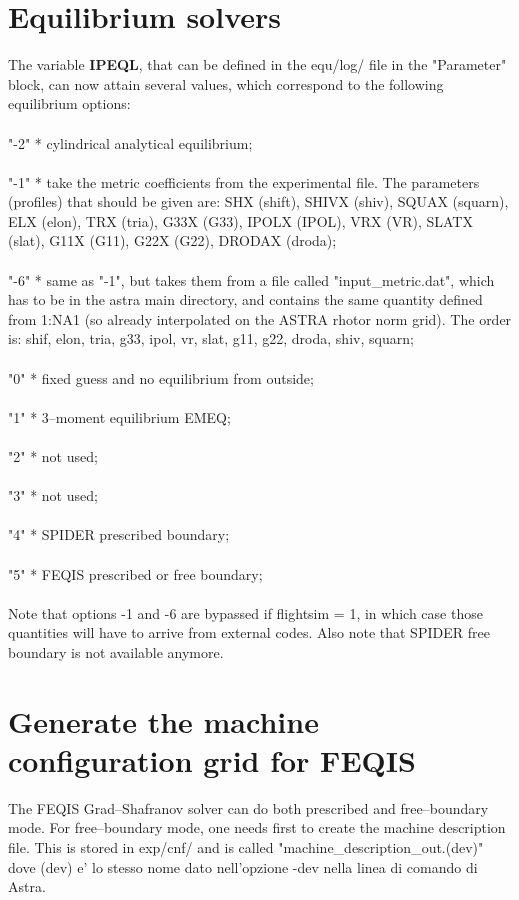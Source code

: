 \documentclass[12pt]{article}
\begin{document}

\section{Equilibrium solvers}
The variable {\bf IPEQL}, that can be defined in the equ/log/ file in the "Parameter" block, can now attain several values, which correspond to the following equilibrium options:\\\\
"-2" * cylindrical analytical equilibrium;\\\\
"-1" * take the metric coefficients from the experimental file. The parameters (profiles) that should be given are: SHX (shift), SHIVX (shiv), SQUAX (squarn), ELX (elon), TRX (tria), G33X (G33), IPOLX (IPOL), VRX (VR), SLATX (slat), G11X (G11), G22X (G22), DRODAX (droda);\\\\
"-6" *  same as "-1", but takes them from a file called "input\_metric.dat", which has to be in the astra main directory, and contains the same quantity defined from 1:NA1 (so already interpolated on the ASTRA rhotor norm grid). The order is: shif, elon, tria, g33, ipol, vr, slat, g11, g22, droda, shiv, squarn;\\\\
"0" * fixed guess and no equilibrium from outside;\\\\
"1" * 3--moment equilibrium EMEQ;\\\\
"2" * not used;\\\\
"3" * not used;\\\\
"4" * SPIDER prescribed boundary;\\\\
"5" * FEQIS prescribed or free boundary;\\\\
Note that options -1 and -6 are bypassed if flightsim = 1, in which case those quantities will have to arrive from external codes.
Also note that SPIDER free boundary is not available anymore. 

\section{Generate the machine configuration grid for FEQIS}
The FEQIS Grad--Shafranov solver can do both prescribed and free--boundary mode. For free--boundary mode, one needs first to create the machine description file. This is stored in exp/cnf/ and is called "machine\_description\_out.(dev)" dove (dev) e' lo stesso nome dato nell'opzione -dev nella linea di comando di Astra.
\end{document}
